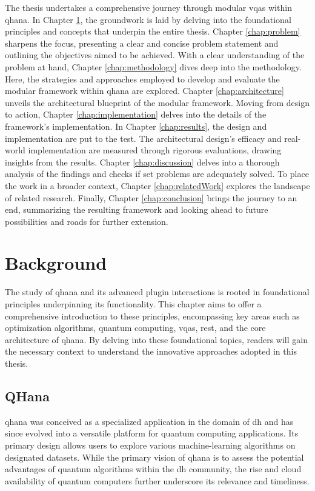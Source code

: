 \documentclass[
  a4paper,  %
  twoside,  %
  bibliography=totoc,
  headsepline,
  cleardoublepage=empty,
  parskip=half,
  draft=false
]{scrbook}
\begin{document}
The thesis undertakes a comprehensive journey through modular \glspl{vqa} within \gls{qhana}.
In Chapter \ref{chap:background}, the groundwork is laid by delving into the foundational principles and concepts that underpin the entire thesis.
Chapter \ref{chap:problem} sharpens the focus, presenting a clear and concise problem statement and outlining the objectives aimed to be achieved.
With a clear understanding of the problem at hand, Chapter \ref{chap:methodology} dives deep into the methodology.
Here, the strategies and approaches employed to develop and evaluate the modular framework within \gls{qhana} are explored.
Chapter \ref{chap:architecture} unveils the architectural blueprint of the modular framework.
Moving from design to action, Chapter \ref{chap:implementation} delves into the details of the framework's implementation.
In Chapter \ref{chap:results}, the design and implementation are put to the test. The architectural design's efficacy and real-world implementation are measured through rigorous evaluations, drawing insights from the results.
Chapter \ref{chap:discussion} delves into a thorough analysis of the findings and checks if set problems are adequately solved.
To place the work in a broader context, Chapter \ref{chap:relatedWork} explores the landscape of related research.
Finally, Chapter \ref{chap:conclusion} brings the journey to an end, summarizing the resulting framework and looking ahead to future possibilities and roads for further extension.


\chapter{Background}
\label{chap:background}

The study of \gls{qhana} and its advanced plugin interactions is rooted in foundational principles underpinning its functionality.
This chapter aims to offer a comprehensive introduction to these principles, encompassing key areas such as optimization algorithms, quantum computing, \glspl{vqa}, \gls{rest}, and the core architecture of \gls{qhana}.
By delving into these foundational topics, readers will gain the necessary context to understand the innovative approaches adopted in this thesis.

\section{QHana}
\label{sec:qhana}

\gls{qhana} was conceived as a specialized application in the domain of \gls{dh} and has since evolved into a versatile platform for quantum computing applications.
Its primary design allows users to explore various machine-learning algorithms on designated datasets.
While the primary vision of \gls{qhana} is to assess the potential advantages of quantum algorithms within the \gls{dh} community, the rise and cloud availability of quantum computers \cite{Castelvecchi2017} further underscore its relevance and timeliness.
\end{document}
